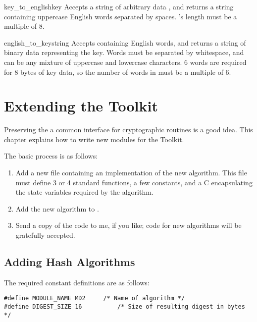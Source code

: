 \documentclass{howto}
\begin{document}
\begin{funcdesc}{key_to_english}{key}
Accepts a string of arbitrary data , and returns a string
containing uppercase English words separated by spaces.  's
length must be a multiple of 8.
\end{funcdesc}

\begin{funcdesc}{english_to_key}{string}
Accepts  containing English words, and returns a string of
binary data representing the key.  Words must be separated by
whitespace, and can be any mixture of uppercase and lowercase
characters.  6 words are required for 8 bytes of key data, so
the number of words in  must be a multiple of 6.
\end{funcdesc}


\section{Extending the Toolkit}

Preserving the a common interface for cryptographic routines is a good
idea.  This chapter explains how to write new modules for the Toolkit.

The basic process is as follows:
\begin{enumerate}

\item Add a new  file containing an implementation of the new
algorithm.
This file must define 3 or 4 standard functions,
a few constants, and a C  encapsulating the state variables required by the algorithm.

\item  Add the new algorithm to .

\item  Send a copy of the code to me, if you like; code for new
algorithms will be gratefully accepted.
\end{enumerate}


\subsection{Adding Hash Algorithms}

The required constant definitions are as follows:

\begin{verbatim}
#define MODULE_NAME MD2		/* Name of algorithm */
#define DIGEST_SIZE 16          /* Size of resulting digest in bytes */
\end{verbatim}
\end{document}
